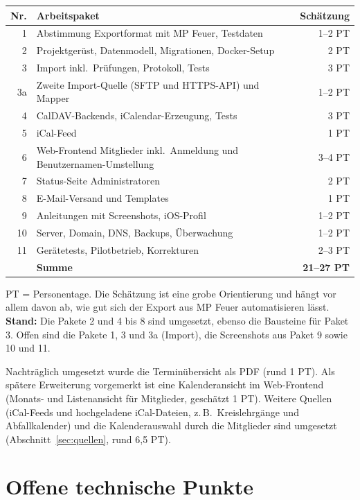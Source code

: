 \begin{center}
\begin{tabularx}{\textwidth}{rXr}
\toprule
\textbf{Nr.} & \textbf{Arbeitspaket} & \textbf{Schätzung} \\
\midrule
1 & Abstimmung Exportformat mit MP Feuer, Testdaten & 1--2 PT \\
2 & Projektgerüst, Datenmodell, Migrationen, Docker-Setup & 2 PT \\
3 & Import inkl.\ Prüfungen, Protokoll, Tests & 3 PT \\
3a & Zweite Import-Quelle (SFTP und HTTPS-API) und Mapper & 1--2 PT \\
4 & CalDAV-Backends, iCalendar-Erzeugung, Tests & 3 PT \\
5 & iCal-Feed & 1 PT \\
6 & Web-Frontend Mitglieder inkl.\ Anmeldung und
    Benutzernamen-Umstellung & 3--4 PT \\
7 & Status-Seite Administratoren & 2 PT \\
8 & E-Mail-Versand und Templates & 1 PT \\
9 & Anleitungen mit Screenshots, iOS-Profil & 1--2 PT \\
10 & Server, Domain, DNS, Backups, Überwachung & 1--2 PT \\
11 & Gerätetests, Pilotbetrieb, Korrekturen & 2--3 PT \\
\midrule
 & \textbf{Summe} & \textbf{21--27 PT} \\
\bottomrule
\end{tabularx}
\end{center}

PT = Personentage. Die Schätzung ist eine grobe Orientierung und hängt vor
allem davon ab, wie gut sich der Export aus MP Feuer automatisieren lässt.
\textbf{Stand:} Die Pakete 2 und 4 bis 8 sind umgesetzt, ebenso die
Bausteine für Paket 3. Offen sind die Pakete 1, 3 und 3a (Import), die
Screenshots aus Paket 9 sowie 10 und 11.

Nachträglich umgesetzt wurde die Terminübersicht als PDF (rund 1 PT). Als
spätere Erweiterung vorgemerkt ist eine Kalenderansicht im Web-Frontend
(Monats- und Listenansicht für Mitglieder, geschätzt 1 PT).
Weitere Quellen (iCal-Feeds und hochgeladene iCal-Dateien, z.\,B.\
Kreislehrgänge und Abfallkalender) und die Kalenderauswahl durch die
Mitglieder sind umgesetzt (Abschnitt~\ref{sec:quellen}, rund 6,5 PT).

\section{Offene technische Punkte}

